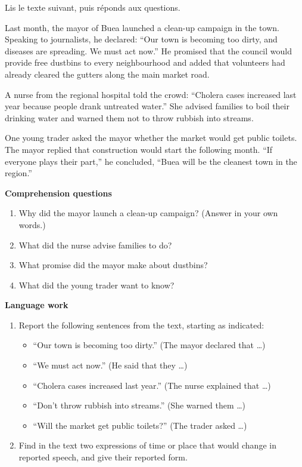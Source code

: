 \documentclass[11pt]{article}
\begin{document}
\begin{exercice}
Lis le texte suivant, puis réponds aux questions.

\begin{textebox}
Last month, the mayor of Buea launched a clean-up campaign in the town. Speaking to journalists, he declared: “Our town is becoming too dirty, and diseases are spreading. We must act now.” He promised that the council would provide free dustbins to every neighbourhood and added that volunteers had already cleared the gutters along the main market road.

A nurse from the regional hospital told the crowd: “Cholera cases increased last year because people drank untreated water.” She advised families to boil their drinking water and warned them not to throw rubbish into streams.

One young trader asked the mayor whether the market would get public toilets. The mayor replied that construction would start the following month. “If everyone plays their part,” he concluded, “Buea will be the cleanest town in the region.”
\end{textebox}

\textbf{Comprehension questions}
\begin{enumerate}
\item Why did the mayor launch a clean-up campaign? (Answer in your own words.)
\item What did the nurse advise families to do?
\item What promise did the mayor make about dustbins?
\item What did the young trader want to know?
\end{enumerate}

\textbf{Language work}
\begin{enumerate}
\item Report the following sentences from the text, starting as indicated:
\begin{itemize}
\item “Our town is becoming too dirty.” (The mayor declared that \ldots)
\item “We must act now.” (He said that they \ldots)
\item “Cholera cases increased last year.” (The nurse explained that \ldots)
\item “Don't throw rubbish into streams.” (She warned them \ldots)
\item “Will the market get public toilets?” (The trader asked \ldots)
\end{itemize}
\item Find in the text two expressions of time or place that would change in reported speech, and give their reported form.
\end{enumerate}
\end{exercice}
\end{document}
